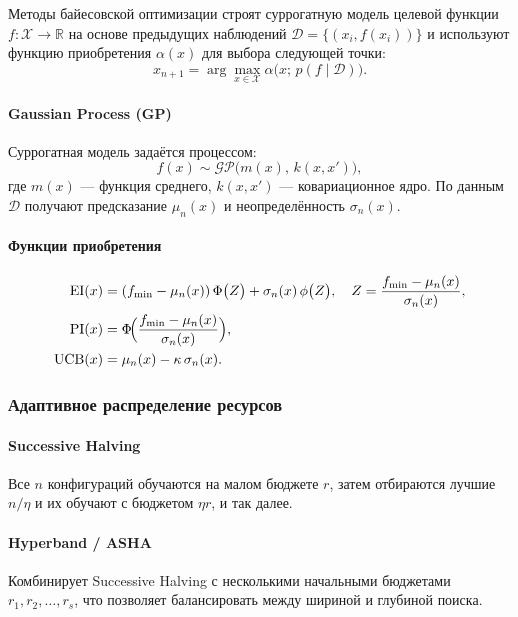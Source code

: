 \begin{center}
Методы байесовской оптимизации строят суррогатную модель целевой функции
\(
f\colon \mathcal{X}\to\mathbb{R}
\)
на основе предыдущих наблюдений \(\mathcal{D}=\{(x_i, f(x_i))\}\) и используют функцию приобретения \(\alpha(x)\) для выбора следующей точки:
\begin{equation}
x_{n+1} = \arg\max_{x\in\mathcal{X}} \alpha\bigl(x;\,p(f\mid\mathcal{D})\bigr).
\label{eq:bayes-opt}
\end{equation}

\paragraph{Gaussian Process (GP)}  
Суррогатная модель задаётся процессом:
\begin{equation}
f(x)\sim\mathcal{GP}\bigl(m(x),\,k(x,x')\bigr),
\label{eq:gp-prior}
\end{equation}
где \(m(x)\) — функция среднего, \(k(x,x')\) — ковариационное ядро. По данным \(\mathcal{D}\) получают предсказание \(\mu_n(x)\) и неопределённость \(\sigma_n(x)\).

\paragraph{Функции приобретения}  
\begin{align}
\mathrm{EI}(x)
&= (f_{\min}-\mu_n(x))\,\Phi\bigl(Z\bigr)
+ \sigma_n(x)\,\phi\bigl(Z\bigr),
\quad Z = \frac{f_{\min}-\mu_n(x)}{\sigma_n(x)},
\label{eq:expected-improvement}\\
\mathrm{PI}(x)
&= \Phi\!\Bigl(\frac{f_{\min}-\mu_n(x)}{\sigma_n(x)}\Bigr),
\label{eq:probability-improvement}\\
\mathrm{UCB}(x)
&= \mu_n(x) - \kappa\,\sigma_n(x).
\label{eq:upper-conf-bound}
\end{align}

\subsubsection{Адаптивное распределение ресурсов}

\paragraph{Successive Halving}  
Все \(n\) конфигураций обучаются на малом бюджете \(r\), затем отбираются лучшие \(n/\eta\) и их обучают с бюджетом \(\eta r\), и так далее.

\paragraph{Hyperband / ASHA}  
Комбинирует Successive Halving с несколькими начальными бюджетами \(r_1, r_2, \dots, r_s\), что позволяет балансировать между шириной и глубиной поиска.


\end{center}
